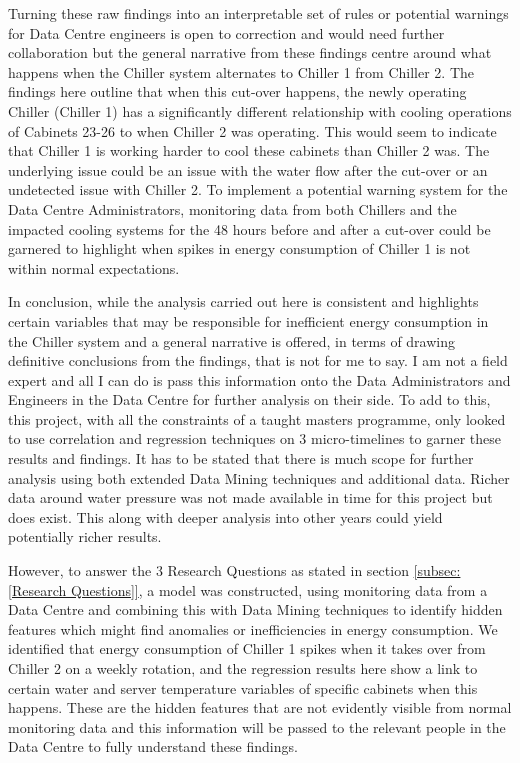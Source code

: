\documentclass[12pt]{scrartcl}
\begin{document}
Turning these raw findings into an interpretable set of rules or potential warnings for Data Centre engineers is open to correction and would need further collaboration but the general narrative from these findings centre around what happens when the Chiller system alternates to Chiller 1 from Chiller 2. The findings here outline that when this cut-over happens, the newly operating Chiller (Chiller 1) has a significantly different relationship with cooling operations of Cabinets 23-26 to when Chiller 2 was operating. This would seem to indicate that Chiller 1 is working harder to cool these cabinets than Chiller 2 was. The underlying issue could be an issue with the water flow after the cut-over or an undetected issue with Chiller 2. To implement a potential warning system for the Data Centre Administrators, monitoring data from both Chillers and the impacted cooling systems for the 48 hours before and after a cut-over could be garnered to highlight when spikes in energy consumption of Chiller 1 is not within normal expectations.               

In conclusion, while the analysis carried out here is consistent and highlights certain variables that may be responsible for inefficient energy consumption in the Chiller system and a general narrative is offered, in terms of drawing definitive conclusions from the findings, that is not for me to say. I am not a field expert and all I can do is pass this information onto the Data Administrators and Engineers in the Data Centre for further analysis on their side. To add to this, this project, with all the constraints of a taught masters programme, only looked to use correlation and regression techniques on 3 micro-timelines to garner these results and findings. It has to be stated that there is much scope for further analysis using both extended Data Mining techniques and additional data. Richer data around water pressure was not made available in time for this project but does exist. This along with deeper analysis into other years could yield potentially richer results.   

However, to answer the 3 Research Questions as stated in section \ref{subsec:[Research Questions]}, a model was constructed, using monitoring data from a Data Centre and combining this with Data Mining techniques to identify hidden features which might find anomalies or inefficiencies in energy consumption. We identified that energy consumption of Chiller 1 spikes when it takes over from Chiller 2 on a weekly rotation, and the regression results here show a link to certain water and server temperature variables of specific cabinets when this happens.   These are the hidden features that are not evidently visible from normal monitoring data and this information will be passed to the relevant people in the Data Centre to fully understand these findings.     
\end{document}
